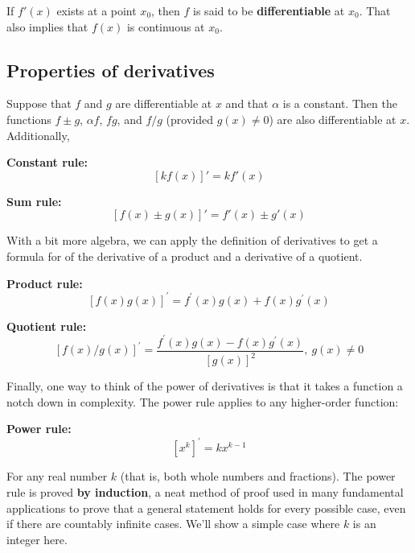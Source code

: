 \documentclass[
  letterpaper,
]{book}
\theoremstyle{definition}
\theoremstyle{definition}
\theoremstyle{plain}
\theoremstyle{definition}
\theoremstyle{plain}
\theoremstyle{plain}
\theoremstyle{remark}
\begin{document}
If \(f'(x)\) exists at a point \(x_0\), then \(f\) is said to be
\textbf{differentiable} at \(x_0\). That also implies that \(f(x)\) is
continuous at \(x_0\).

\hypertarget{properties-of-derivatives}{%
\subsection*{Properties of
derivatives}\label{properties-of-derivatives}}

Suppose that \(f\) and \(g\) are differentiable at \(x\) and that
\(\alpha\) is a constant. Then the functions \(f\pm g\), \(\alpha f\),
\(f g\), and \(f/g\) (provided \(g(x)\ne 0\)) are also differentiable at
\(x\). Additionally,

\textbf{Constant rule:} \[\left[k f(x)\right]' = k f'(x)\]

\textbf{Sum rule:} \[\left[f(x)\pm g(x)\right]' = f'(x)\pm g'(x)\]

With a bit more algebra, we can apply the definition of derivatives to
get a formula for of the derivative of a product and a derivative of a
quotient.

\textbf{Product rule:}
\[\left[f(x)g(x)\right]^\prime = f^\prime(x)g(x)+f(x)g^\prime(x)\]

\textbf{Quotient rule:}
\[\left[f(x)/g(x)\right]^\prime = \frac{f^\prime(x)g(x) - f(x)g^\prime(x)}{[g(x)]^2}, ~g(x)\neq 0\]

Finally, one way to think of the power of derivatives is that it takes a
function a notch down in complexity. The power rule applies to any
higher-order function:

\textbf{Power rule:} \[\left[x^k\right]^\prime = k x^{k-1}\]

For any real number \(k\) (that is, both whole numbers and fractions).
The power rule is proved \textbf{by induction}, a neat method of proof
used in many fundamental applications to prove that a general statement
holds for every possible case, even if there are countably infinite
cases. We'll show a simple case where \(k\) is an integer here.
\end{document}

